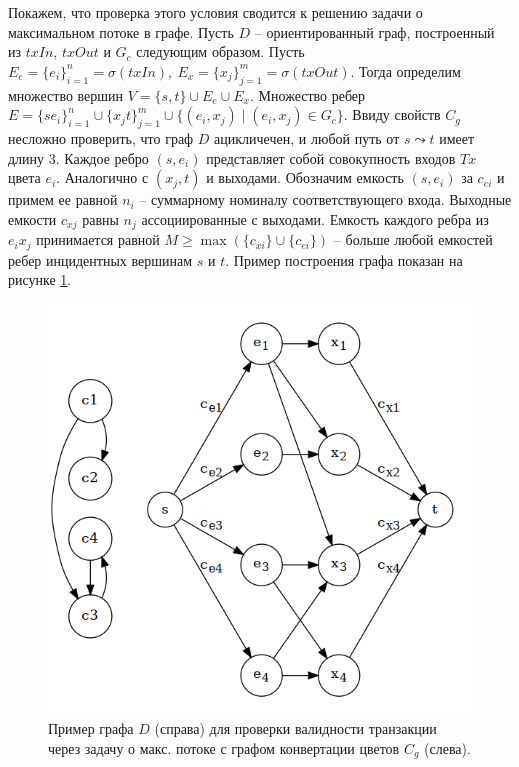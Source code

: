 \documentclass[specification,annotation]{itmo-student-thesis}
\begin{document}
Покажем, что проверка этого условия сводится к решению задачи о
максимальном потоке в графе. Пусть $D$ -- ориентированный граф,
построенный из $txIn$, $txOut$ и $G_c$ следующим образом. Пусть $E_e =
\{e_i\}_{i=1}^n = \sigma(txIn),\ E_x = \{x_j\}_{j=1}^m =
\sigma(txOut)$. Тогда определим множество вершин $V = \{s, t\} \cup
E_e \cup E_x$. Множество ребер $E = \{se_i\}_{i=1}^n \cup
\{x_jt\}_{j=1}^m \cup \{(e_i,x_j) \mid (e_i,x_j) \in G_c\}$. Ввиду
свойств $C_g$ несложно проверить, что граф $D$ ацикличечен, и любой
путь от $s \leadsto t$ имеет длину $3$. Каждое ребро $(s,e_i)$
представляет собой совокупность входов $Tx$ цвета $e_i$. Аналогично с
$(x_j,t)$ и выходами. Обозначим емкость $(s,e_i)$ за $c_{ei}$ и примем
ее равной $n_i$ -- суммарному номиналу соответствующего
входа. Выходные емкости $c_{xj}$ равны $n_j$ ассоциированные с
выходами. Емкость каждого ребра из $e_ix_j$ принимается равной $M \geq
\max{(\{c_{xi}\} \cup \{c_{ei}\})}$ -- больше любой емкостей ребер
инцидентных вершинам $s$ и $t$. Пример построения графа показан на
рисунке \ref{fig:txgraph1}.

\begin{figure}[h]
  \caption{Пример графа $D$ (справа) для проверки валидности
    транзакции через задачу о макс. потоке с графом конвертации цветов
    $C_g$ (слева). \label{fig:txgraph1}} \centering
  \includegraphics[scale=0.45]{txgraph1}
\end{figure}
\end{document}
